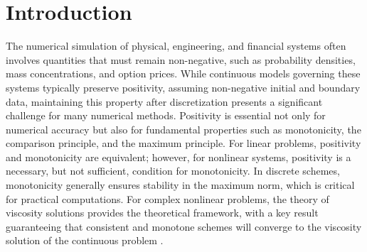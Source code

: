 \documentclass[11pt]{article}
\theoremstyle{mythm}
\theoremstyle{definition}
\begin{document}
	\section{Introduction}\label{sec1}
	The numerical simulation of physical, engineering, and financial systems
	often involves quantities that must remain non-negative, such as
	probability densities, mass concentrations, and option prices.
	While continuous models governing these systems typically preserve
	positivity, assuming non-negative initial and boundary data, maintaining
	this property after discretization presents a significant challenge for
	many numerical methods.
	Positivity is essential not only for numerical accuracy but also for
	fundamental properties such as monotonicity, the comparison principle,
	and the maximum principle.
	For linear problems, positivity and monotonicity are equivalent; however,
	for nonlinear systems, positivity is a necessary, but not sufficient,
	condition for monotonicity.
	In discrete schemes, monotonicity generally ensures stability in the
	maximum norm, which is critical for practical computations.
	For complex nonlinear problems, the theory of viscosity solutions
	provides the theoretical framework, with a key result guaranteeing that
	consistent and monotone schemes will converge to the viscosity solution
	of the continuous problem \cite{bib1}.
	
\end{document}
